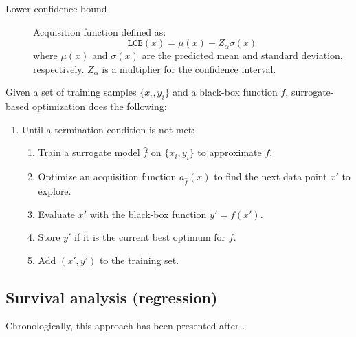 \begin{description}
\begin{description}
\begin{description}
                        \begin{description}
                            \item[Lower confidence bound]
                                Acquisition function defined as:
                                \[ \texttt{LCB}(x) = \mu(x) - Z_\alpha \sigma(x) \]
                                where $\mu(x)$ and $\sigma(x)$ are the predicted mean and standard deviation, respectively. $Z_\alpha$ is a multiplier for the confidence interval.
                        \end{description}
                \end{description}

                Given a set of training samples $\{ x_i, y_i \}$ and a black-box function $f$, surrogate-based optimization does the following:
                \begin{enumerate}
                    \item Until a termination condition is not met:
                    \begin{enumerate}
                        \item Train a surrogate model $\hat{f}$ on $\{ x_i, y_i \}$ to approximate $f$.
                        \item Optimize an acquisition function $a_{\hat{f}}(x)$ to find the next data point $x'$ to explore.
                        \item Evaluate $x'$ with the black-box function $y' = f(x')$.
                        \item Store $y'$ if it is the current best optimum for $f$.
                        \item Add $(x', y')$ to the training set.
                    \end{enumerate}
                \end{enumerate}
        \end{description}
\end{description}


\subsection{Survival analysis (regression)}

\begin{remark}
    Chronologically, this approach has been presented after .
\end{remark}

